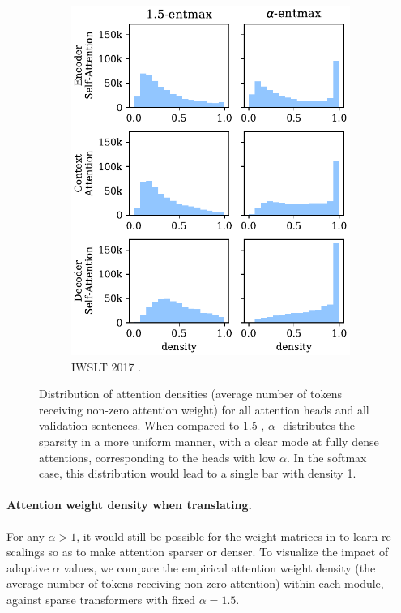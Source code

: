 \begin{figure}[!htbp]
\begin{subfigure}[b]{.49\linewidth}
        \includegraphics[width=\linewidth]{Figures/hist_densities_de.pdf}
        \caption{%
            \label{fig:hist_densities_de}%
            IWSLT 2017 .}
    \end{subfigure}
    \caption{%
        \label{fig:hist_densities}
        Distribution of attention densities (average number of tokens
        receiving non-zero attention weight) for all attention heads and all
        validation sentences.
        When compared to 1.5-\entmaxtext{}, $\alpha$-\entmaxtext{}
        distributes the sparsity in a more uniform manner, with a clear mode
        at fully dense attentions, corresponding to the heads with low
        $\alpha$. In the softmax case, this distribution would lead to a
        single bar with density 1.}
\end{figure}

\paragraph*{Attention weight density when translating.}
For any $\alpha>1$, it would still be possible for the weight
matrices in  to learn re-scalings so as to make
attention sparser or denser. To visualize the impact of adaptive
$\alpha$ values, we compare the empirical attention weight density
(the average number of tokens receiving non-zero attention) within
each module, against sparse transformers with fixed $\alpha=1.5$.

